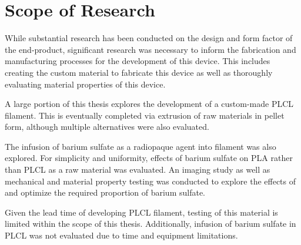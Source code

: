 \section{Scope of Research\label{introduction:scopeOfResearch}}

While substantial research has been conducted on the design and form factor of the end-product, significant research was necessary to inform the fabrication and manufacturing processes for the development of this device. This includes creating the custom material to fabricate this device as well as thoroughly evaluating material properties of this device.

A large portion of this thesis explores the development of a custom-made PLCL filament. This is eventually completed via extrusion of raw materials in pellet form, although multiple alternatives were also evaluated.

The infusion of barium sulfate as a radiopaque agent into filament was also explored. For simplicity and uniformity, effects of barium sulfate on PLA rather than PLCL as a raw material was evaluated. An imaging study as well as mechanical and material property testing was conducted to explore the effects of and optimize the required proportion of barium sulfate.

Given the lead time of developing PLCL filament, testing of this material is limited within the scope of this thesis. Additionally, infusion of barium sulfate in PLCL was not evaluated due to time and equipment limitations.

